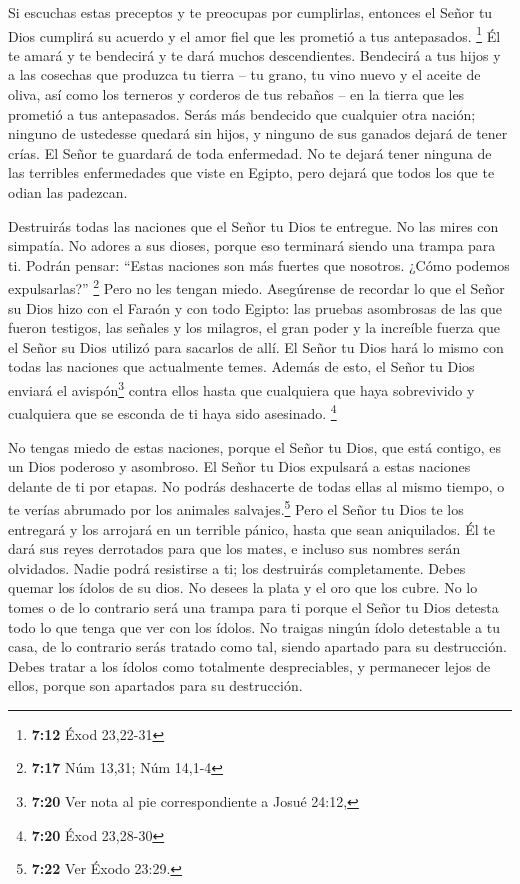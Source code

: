  Si escuchas estas preceptos y te preocupas por
cumplirlas, entonces el Señor tu Dios cumplirá su acuerdo y el amor fiel
que les prometió a tus antepasados. \footnote{\textbf{7:12} Éxod
  23,22-31}  Él te amará y te bendecirá y te dará muchos
descendientes. Bendecirá a tus hijos y a las cosechas que produzca tu
tierra -- tu grano, tu vino nuevo y el aceite de oliva, así como los
terneros y corderos de tus rebaños -- en la tierra que les prometió a
tus antepasados.  Serás más bendecido que cualquier otra
nación; ninguno de ustedesse quedará sin hijos, y ninguno de sus ganados
dejará de tener crías.  El Señor te guardará de toda
enfermedad. No te dejará tener ninguna de las terribles enfermedades que
viste en Egipto, pero dejará que todos los que te odian las padezcan.

 Destruirás todas las naciones que el Señor tu Dios te
entregue. No las mires con simpatía. No adores a sus dioses, porque eso
terminará siendo una trampa para ti.  Podrán pensar:
``Estas naciones son más fuertes que nosotros. ¿Cómo podemos
expulsarlas?'' \footnote{\textbf{7:17} Núm 13,31; Núm 14,1-4}
 Pero no les tengan miedo. Asegúrense de recordar lo que
el Señor su Dios hizo con el Faraón y con todo Egipto: 
las pruebas asombrosas de las que fueron testigos, las señales y los
milagros, el gran poder y la increíble fuerza que el Señor su Dios
utilizó para sacarlos de allí. El Señor tu Dios hará lo mismo con todas
las naciones que actualmente temes.  Además de esto, el
Señor tu Dios enviará el avispón\footnote{\textbf{7:20} Ver nota al pie
  correspondiente a Josué 24:12,} contra ellos hasta que cualquiera que
haya sobrevivido y cualquiera que se esconda de ti haya sido asesinado.
\footnote{\textbf{7:20} Éxod 23,28-30}

 No tengas miedo de estas naciones, porque el Señor tu
Dios, que está contigo, es un Dios poderoso y asombroso. 
El Señor tu Dios expulsará a estas naciones delante de ti por etapas. No
podrás deshacerte de todas ellas al mismo tiempo, o te verías abrumado
por los animales salvajes.\footnote{\textbf{7:22} Ver Éxodo 23:29.}
 Pero el Señor tu Dios te los entregará y los arrojará en
un terrible pánico, hasta que sean aniquilados.  Él te
dará sus reyes derrotados para que los mates, e incluso sus nombres
serán olvidados. Nadie podrá resistirse a ti; los destruirás
completamente.  Debes quemar los ídolos de su dios. No
desees la plata y el oro que los cubre. No lo tomes o de lo contrario
será una trampa para ti porque el Señor tu Dios detesta todo lo que
tenga que ver con los ídolos.  No traigas ningún ídolo
detestable a tu casa, de lo contrario serás tratado como tal, siendo
apartado para su destrucción. Debes tratar a los ídolos como totalmente
despreciables, y permanecer lejos de ellos, porque son apartados para su
destrucción.

